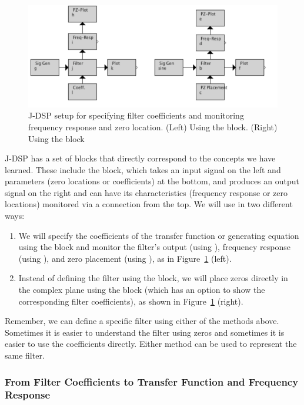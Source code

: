 \begin{figure}
  \begin{center}
    \includegraphics[width=5in]{lab4/polezerodiagrams}
  \end{center}
  \caption{J-DSP setup for specifying filter coefficients and monitoring
  frequency response and zero location. (Left) Using the  block. (Right) Using the  block
  \label{fg:PZfigs}}
\end{figure}

J-DSP has a set of blocks that directly correspond to the concepts we
have learned. These include the  block, which takes an
input signal on the left and parameters (zero locations or
coefficients) at the bottom, and produces an output signal on the
right and can have its characteristics (frequency response or zero
locations) monitored via a connection from the top. We will use
 in two different ways:
\begin{enumerate}
\item We will specify the coefficients of the transfer function or
  generating equation using the  block and monitor the
  filter's output (using ), frequency response (using
  ), and zero placement (using ), as
  in Figure~\ref{fg:PZfigs} (left).
\item Instead of defining the filter using the  block, we will
  place zeros directly in the complex plane using the  block (which has an option to show the corresponding
  filter coefficients), as shown in Figure~\ref{fg:PZfigs} (right).
\end{enumerate}
Remember, we can define a specific filter using either of the methods
above. Sometimes it is easier to understand the filter using zeros and
sometimes it is easier to use the coefficients directly.  Either
method can be used to represent the same filter.


\subsubsection{From Filter Coefficients to Transfer Function and Frequency Response}

